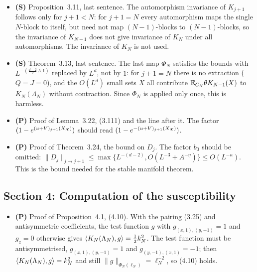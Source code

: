 \documentclass[11pt]{amsart}
\numberwithin{equation}{section}
\newcommand{\dplus}{(\frac{d-2}{2} \wedge 1)}
\begin{document}
\begin{itemize}
\item \textbf{(S)} Proposition~3.11, last sentence. The automorphism invariance of $K_{j+1}$
  follows only for $j+1<N$: for $j+1=N$ every automorphism maps the single $N$-block to itself,
  but need not map $(N-1)$-blocks to $(N-1)$-blocks, so the invariance of $K_{N-1}$ does not
  give invariance of $K_N$ under all automorphisms. The invariance of $K_N$ is not used.

\item \textbf{(S)} Theorem~3.13, last sentence. The last map $\Phi_N$ satisfies the bounds with
  $L^{-\dplus}$ replaced by $L^d$, not by $1$: for $j+1=N$ there is no extraction ($Q=J=0$), and
  the $O(L^d)$ small sets $X$ all contribute $\mathbb{E}_{C_N}\theta K_{N-1}(X)$ to $K_N(\Lambda_N)$
  without contraction. Since $\Phi_N$ is applied only once, this is harmless.

\item \textbf{(P)} Proof of Lemma~3.22, (3.111) and the line after it. The factor
  $(1-e^{(u+V)_{j+1}(X_{\mathcal X})})$ should read $(1-e^{-(u+V)_{j+1}(X_{\mathcal X})})$.

\item \textbf{(P)} Proof of Theorem~3.24, the bound on $D_j$. The factor $b_0$ should be
  omitted: $\|D_j\|_{j\to j+1}\le\max\{L^{-(d-2)},O(L^{-3}+A^{-\eta})\}\le O(L^{-\kappa})$. This is
  the bound needed for the stable manifold theorem.
\end{itemize}

\subsection*{Section 4: Computation of the susceptibility}

\begin{itemize}
\item \textbf{(P)} Proof of Proposition~4.1, (4.10). With the pairing (3.25) and antisymmetric
  coefficients, the test function $g$ with $g_{(x,1),(y,-1)}=1$ and $g_z=0$ otherwise gives
  $\langle K_N(\Lambda_N),g \rangle=\frac12k_N^2$. The test function must be antisymmetrised,
  $g_{(x,1),(y,-1)}=1$ and $g_{(y,-1),(x,1)}=-1$; then $\langle K_N(\Lambda_N),g \rangle=k_N^2$ and still
  $\|g\|_{\Phi_N(\ell_N)}=\ell_N^{-2}$, so (4.10) holds.
\end{itemize}
\end{document}
